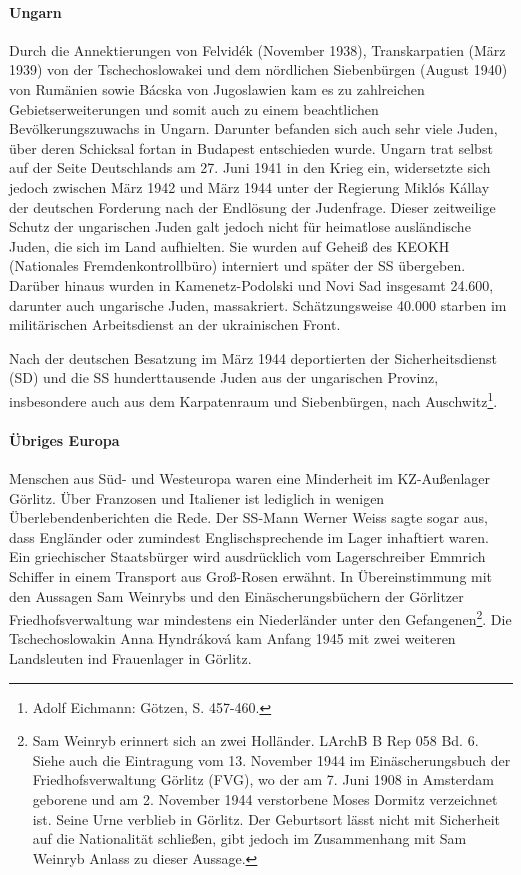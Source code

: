 \documentclass[a4paper,12pt,ngerman,
]{nisebook}
\begin{document}
\paragraph{Ungarn}\label{ungarn} Durch die Annektierungen von Felvid\'ek (November 1938), Transkarpatien (März 1939) von der Tschechoslowakei und dem nördlichen Siebenbürgen (August 1940) von Rumänien sowie B\'acska von Jugoslawien kam es zu zahlreichen Gebietserweiterungen und somit auch zu einem beachtlichen Bevölkerungszuwachs in Ungarn. Darunter befanden sich auch sehr viele Juden, über deren Schicksal fortan in Budapest entschieden wurde. Ungarn trat selbst auf der Seite Deutschlands am 27. Juni 1941 in den Krieg ein, widersetzte
sich jedoch zwischen März 1942 und März 1944 unter der Regierung Mikl\'os K\'allay der deutschen Forderung nach der Endlösung der Judenfrage. Dieser zeitweilige Schutz der ungarischen Juden galt jedoch nicht für heimatlose ausländische Juden, die sich im Land aufhielten. Sie wurden auf Geheiß des KEOKH (Nationales Fremdenkontrollbüro) interniert und später der SS übergeben. Darüber hinaus wurden in Kamenetz-Podolski und Novi Sad insgesamt 24.600, darunter auch ungarische Juden, massakriert. Schätzungsweise 40.000 starben im militärischen Arbeitsdienst an der ukrainischen Front.

Nach der deutschen Besatzung im März 1944 deportierten der Sicherheitsdienst (SD) und die SS hunderttausende Juden aus der ungarischen Provinz, insbesondere auch aus dem Karpatenraum und Siebenbürgen, nach Auschwitz\footnote{Adolf Eichmann: Götzen, S. 457-460.}.
\newpage
\paragraph{Übriges Europa} Menschen aus Süd- und Westeuropa waren eine Minderheit im KZ-Außenlager Görlitz. Über Franzosen und Italiener ist lediglich in wenigen Überlebendenberichten die Rede. Der SS-Mann Werner Weiss sagte sogar aus, dass Engländer oder zumindest Englischsprechende im Lager inhaftiert waren. Ein griechischer Staatsbürger wird ausdrücklich vom Lagerschreiber Emmrich Schiffer in einem Transport aus Groß-Rosen erwähnt. In Übereinstimmung mit den Aussagen Sam Weinrybs und den Einäscherungsbüchern der Görlitzer Friedhofsverwaltung war mindestens ein Niederländer unter den Gefangenen\footnote{Sam Weinryb erinnert sich an zwei \glqq Holländer\grqq. LArchB B Rep 058 Bd. 6. Siehe auch die Eintragung vom 13. November 1944 im Einäscherungsbuch der Friedhofsverwaltung Görlitz (FVG), wo der am 7. Juni 1908 in Amsterdam geborene und am 2. November 1944 verstorbene Moses Dormitz verzeichnet ist. Seine Urne verblieb in Görlitz. Der Geburtsort lässt nicht mit Sicherheit auf die Nationalität schließen, gibt jedoch im Zusammenhang mit Sam Weinryb Anlass zu dieser Aussage.}. Die Tschechoslowakin Anna Hyndr\'akov\'a kam Anfang 1945 mit zwei weiteren Landsleuten ind Frauenlager in Görlitz.
\end{document}
